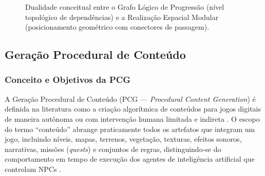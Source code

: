 \begin{figure}[htbp]
{%
  }
  \caption{Dualidade conceitual entre o Grafo Lógico de Progressão (nível topológico de dependências) e a Realização Espacial Modular (posicionamento geométrico com conectores de passagem).}
  \label{fig:dualidade_logica_espaco}
\end{figure}

\subsection{Geração Procedural de Conteúdo}
\label{sec:pcg}

\subsubsection{Conceito e Objetivos da PCG}
\label{sec:conceito_pcg}

A Geração Procedural de Conteúdo (PCG --- \textit{Procedural Content Generation}) é definida na literatura como a criação algorítmica de conteúdos para jogos digitais de maneira autônoma ou com intervenção humana limitada e indireta \cite{pcgbook, summerville2018procedural, maleki2024procedural}. O escopo do termo ``conteúdo'' abrange praticamente todos os artefatos que integram um jogo, incluindo níveis, mapas, terrenos, vegetação, texturas, efeitos sonoros, narrativas, missões (\textit{quests}) e conjuntos de regras, distinguindo-se do comportamento em tempo de execução dos agentes de inteligência artificial que controlam NPCs \cite{pcgbook, summerville2018procedural, maleki2024procedural}.

